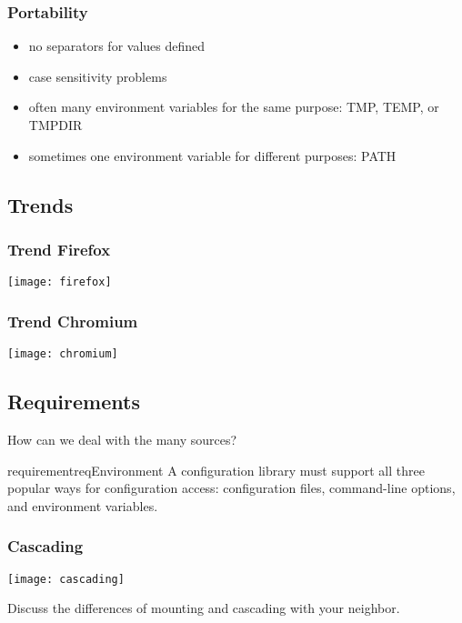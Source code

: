 \documentclass{beamer}
\begin{document}
\begin{frame}
	\frametitle{Portability}
	\begin{itemize}
	\item no separators for values defined
	\item case sensitivity problems
	\item often many environment variables for the same purpose: TMP, TEMP, or TMPDIR
	\item sometimes one environment variable for different purposes: PATH
	\end{itemize}
\end{frame}

\subsection{Trends}

\begin{frame}
	\frametitle{Trend Firefox}
	\texttt{[image: firefox]}
\end{frame}

\begin{frame}
	\frametitle{Trend Chromium}
	\texttt{[image: chromium]}
\end{frame}

\subsection{Requirements}

\begin{frame}
	How can we deal with the many sources?

	\vspace{1cm}

	\begin{restatable}{requirement}{reqEnvironment}
	A configuration library must support all three popular ways for configuration access:
	configuration files, command-line options, and environment variables.
	\end{restatable}
\end{frame}

\begin{frame}
	\frametitle{Cascading}
	\texttt{[image: cascading]}
\end{frame}

\begin{assignment}
	\begin{task}
	Discuss the differences of mounting and cascading with your neighbor.
	\end{task}
\end{assignment}
\end{document}
